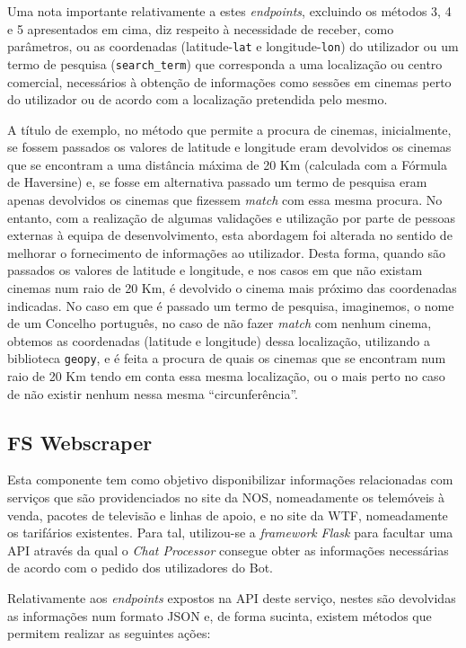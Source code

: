 \documentclass[11pt,a4paper]{article}
\begin{document}
Uma nota importante relativamente a estes \emph{endpoints}, excluindo os métodos 3, 4 e 5 apresentados em
cima, diz respeito à necessidade de receber, como parâmetros, ou as coordenadas (latitude-\texttt{lat} e
longitude-\texttt{lon}) do utilizador ou um termo de pesquisa (\texttt{search\_term}) que corresponda a uma
localização ou centro comercial, necessários à obtenção de informações como sessões em cinemas perto do
utilizador ou de acordo com a localização pretendida pelo mesmo.

A título de exemplo, no método que permite a procura de cinemas, inicialmente, se fossem passados os valores
de latitude e longitude eram devolvidos os cinemas que se encontram a uma distância máxima de 20 Km
(calculada com a Fórmula de Haversine) e, se fosse em alternativa passado um termo de pesquisa eram apenas
devolvidos os cinemas que fizessem \emph{match} com essa mesma procura. No entanto, com a realização de
algumas validações e utilização por parte de pessoas externas à equipa de desenvolvimento, esta abordagem
foi alterada no sentido de melhorar o fornecimento de informações ao utilizador. Desta forma, quando são
passados os valores de latitude e longitude, e nos casos em que não existam cinemas num raio de 20 Km, é
devolvido o cinema mais próximo das coordenadas indicadas. No caso em que é passado um termo de pesquisa,
imaginemos, o nome de um Concelho português, no caso de não fazer \emph{match} com nenhum cinema, obtemos as
coordenadas (latitude e longitude) dessa localização, utilizando a biblioteca \texttt{geopy}, e é feita a
procura de quais os cinemas que se encontram num raio de 20 Km tendo em conta essa mesma localização, ou o
mais perto no caso de não existir nenhum nessa mesma ``circunferência''.

\subsection{FS Webscraper}\label{sec:fs_scrapper}
Esta componente tem como objetivo disponibilizar informações relacionadas com serviços que são
providenciados no site da NOS, nomeadamente os telemóveis à venda, pacotes de televisão e linhas de apoio, e
no site da WTF, nomeadamente os tarifários existentes. Para tal, utilizou-se a \textit{framework}
\textit{Flask} para facultar uma API através da qual o \textit{Chat Processor} consegue obter as informações
necessárias de acordo com o pedido dos utilizadores do Bot.

Relativamente aos \emph{endpoints} expostos na API deste serviço, nestes são devolvidas as informações num
formato JSON e, de forma sucinta, existem métodos que permitem realizar as seguintes ações:
\end{document}
